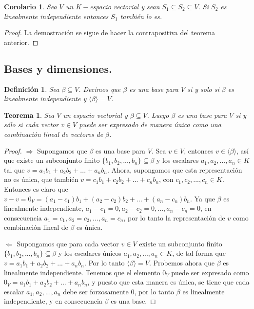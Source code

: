 \documentclass{book}
\newtheorem{theorem}{Teorema}
\newtheorem{definition}{Definición}
\newtheorem{corollary}{Corolario}
\begin{document}
\begin{corollary}
Sea $V$ un $K-$espacio vectorial y sean $S_1\subseteq S_2\subseteq V$. Si $S_2$ es linealmente independiente entonces $S_1$ también lo es.
\end{corollary}

\begin{proof}
La demostración se sigue de hacer la contrapositiva del teorema anterior.
\end{proof}

\subsection{Bases y dimensiones.}

\begin{definition}
Sea $\beta \subseteq V$. Decimos que $\beta$ es una base para $V$ si y solo si $\beta$ es linealmente independiente y $\langle \beta \rangle=V$.
\end{definition}

\begin{theorem}

Sea $V$ un espacio vectorial y $\beta\subseteq V$. Luego $\beta$ es una base para $V$ si y sólo si cada vector $v \in V$ puede ser expresado de manera única como una combinación lineal de vectores de $\beta$.

\end{theorem}

\begin{proof}

$\Rightarrow$ Supongamos que $\beta$ es una base para $V$. Sea $v \in V$, entonces $v \in \langle \beta \rangle$, así que existe un subconjunto finito $\{b_1,b_2,...,b_n\}\subseteq \beta$ y los escalares $a_1, a_2, ..., a_n \in K$ tal que $v = a_1 b_1 + a_2 b_2 + ...+ a_n b_n$. Ahora, supongamos que esta representación no es única, que también $v = c_1 b_1 + c_2 b_2 + ...+ c_n b_n$, con $c_1,c_2,...,c_n \in K$. Entonces es claro que $v-v=0_V=(a_1 - c_1)b_1+(a_2 -c_2)b_2 +...+(a_n -c_n)b_n$. Ya que $\beta$ es linealmente independiente, $a_1 -c_1=0, a_2 -c_2=0, ..., a_n -c_n=0$, en consecuencia $a_1=c_1, a_2 =c_2, ..., a_n =c_n$, por lo tanto la representación de $v$ como combinación lineal de $\beta$ es única.\newline

$\Leftarrow$ Supongamos que para cada vector $v \in V$ existe un subconjunto finito $\{b_1,b_2,...,b_n\} \subseteq \beta$ y los escalares únicos $a_1, a_2, ..., a_n \in K$, de tal forma que $v= a_1 b_1 + a_2 b_2 + ...+ a_n b_n$. Por lo tanto $\langle \beta \rangle=V$. Probemos ahora que $\beta$ es linealmente independiente. Tenemos que el elemento $0_V$ puede ser expresado como $0_V=a_1b_1+a_2b_2+...+a_nb_n$, y puesto que esta manera es única, se tiene que cada escalar $a_1, a_2, ..., a_n$ debe ser forzosamente $0$, por lo tanto $\beta$ es linealmente independiente, y en consecuencia $\beta$ es una base.

\end{proof}
\end{document}

